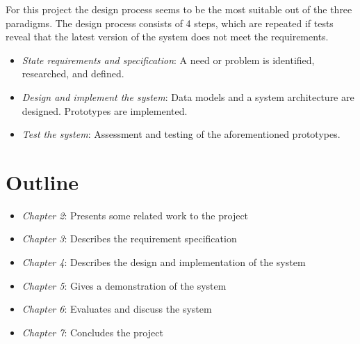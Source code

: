 For this project the design process seems to be the most suitable out of the three paradigms. The design process consists of 4 steps, which are repeated if tests reveal that the latest version of the system does not meet the requirements.

\begin{itemize}
\item \emph{State requirements and specification}: A need or problem is identified, researched, and defined.
\item \emph{Design and implement the system}: Data models and a system architecture are designed. Prototypes are implemented.
\item \emph{Test the system}: Assessment and testing of the aforementioned prototypes.
\end{itemize}

\section{Outline}

\begin{itemize}
\item \emph{Chapter 2}: Presents some related work to the project
\item \emph{Chapter 3}: Describes the requirement specification
\item \emph{Chapter 4}: Describes the design and implementation of the system
\item \emph{Chapter 5}: Gives a demonstration of the system
\item \emph{Chapter 6}: Evaluates and discuss the system
\item \emph{Chapter 7}: Concludes the project 
\end{itemize}



